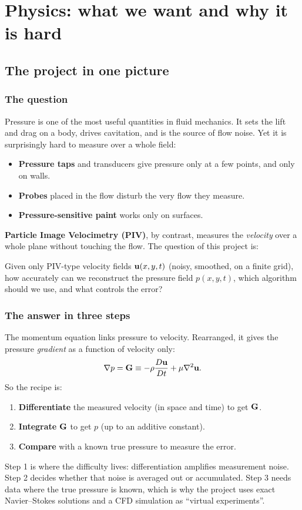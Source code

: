 \part{Physics: what we want and why it is hard}

\chapter{The project in one picture}

\section{The question}
Pressure is one of the most useful quantities in fluid mechanics. It sets the lift and drag on a body, drives cavitation, and is the source of flow noise. Yet it is surprisingly hard to measure over a whole field:
\begin{itemize}
  \item \textbf{Pressure taps} and transducers give pressure only at a few points, and only on walls.
  \item \textbf{Probes} placed in the flow disturb the very flow they measure.
  \item \textbf{Pressure-sensitive paint} works only on surfaces.
\end{itemize}
\textbf{Particle Image Velocimetry (PIV)}, by contrast, measures the \emph{velocity} over a whole plane without touching the flow. The question of this project is:

\begin{keyidea}
Given only PIV-type velocity fields $\mathbf{u}(x,y,t)$ (noisy, smoothed, on a finite grid), how accurately can we reconstruct the pressure field $p(x,y,t)$, which algorithm should we use, and what controls the error?
\end{keyidea}

\section{The answer in three steps}
The momentum equation links pressure to velocity. Rearranged, it gives the pressure \emph{gradient} as a function of velocity only:
\begin{equation}
\nabla p = \mathbf{G} \equiv -\rho\frac{D\mathbf{u}}{Dt} + \mu\nabla^2\mathbf{u} .
\end{equation}
So the recipe is:
\begin{enumerate}
  \item \textbf{Differentiate} the measured velocity (in space and time) to get $\mathbf{G}$.
  \item \textbf{Integrate} $\mathbf{G}$ to get $p$ (up to an additive constant).
  \item \textbf{Compare} with a known true pressure to measure the error.
\end{enumerate}
Step 1 is where the difficulty lives: differentiation amplifies measurement noise. Step 2 decides whether that noise is averaged out or accumulated. Step 3 needs data where the true pressure is known, which is why the project uses exact Navier--Stokes solutions and a CFD simulation as ``virtual experiments''.


